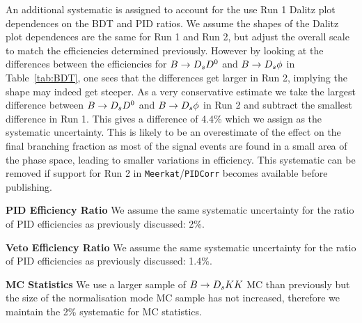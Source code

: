 {\begin{description}
An additional systematic is assigned to account for the use Run 1 Dalitz plot dependences on the BDT and PID ratios. We assume the shapes of the Dalitz plot dependences are the same for Run 1 and Run 2, but adjust the overall scale to match the efficiencies determined previously. However by looking at the differences between the efficiencies for ${B} \rightarrow {\ensuremath{{D}_{s}}} {\ensuremath{{D}^0}}$ and ${B} \rightarrow {\ensuremath{{D}_{s}}} \phi$ in Table~\ref{tab:BDT}, one sees that the differences get larger in Run 2, implying the shape may indeed get steeper. As a very conservative estimate we take the largest difference between ${B} \rightarrow {\ensuremath{{D}_{s}}} {\ensuremath{{D}^0}}$ and ${B} \rightarrow {\ensuremath{{D}_{s}}} \phi$ in Run 2 and subtract the smallest difference in Run 1. This gives a difference of 4.4\% which we assign as the systematic uncertainty. This is likely to be an overestimate of the effect on the final branching fraction as most of the signal events are found in a small area of the phase space, leading to smaller variations in efficiency. This systematic can be removed if support for Run 2 in \texttt{Meerkat}/\texttt{PIDCorr} becomes available before publishing.


\item \textbf{PID Efficiency Ratio} We assume the same systematic uncertainty for the ratio of PID efficiencies as previously discussed: 2\%. 

\item \textbf{Veto Efficiency Ratio} We assume the same systematic uncertainty for the ratio of PID efficiencies as previously discussed: 1.4\%. 


\item \textbf{MC Statistics} We use a larger sample of ${B} \rightarrow {\ensuremath{{D}_{s}}} K K$ MC than previously but the size of the normalisation mode MC sample has not increased, therefore we maintain the 2\% systematic for MC statistics.

\end{description}
}

